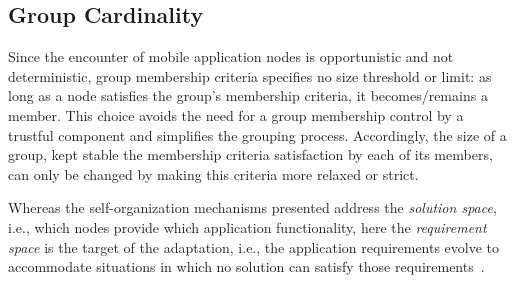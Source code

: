\subsection{Group Cardinality} 

Since the encounter of mobile application nodes is opportunistic and not deterministic, group membership criteria specifies no size threshold or limit: as long as a node satisfies the group's membership criteria, it becomes/remains a member. This choice avoids the need for a group membership control by a trustful component and simplifies the grouping process. Accordingly, the size of a group, kept stable the membership criteria satisfaction by each of its members, can only be changed by making this criteria more relaxed or strict. 

Whereas the self-organization mechanisms presented address the \textit{solution space}, i.e., which nodes provide which application functionality, here the \textit{requirement space} is the target of the adaptation, i.e., the application requirements evolve to accommodate situations in which no solution can satisfy those requirements~\cite{RELAX}. 
